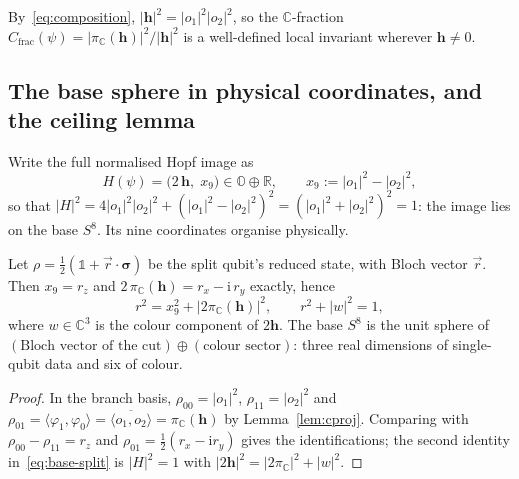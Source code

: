\begin{corollary}\label{app:cor:cproj}
By~\eqref{eq:composition}, $|\mathbf{h}|^2 = |o_1|^2|o_2|^2$, so the $\mathbb{C}$-fraction
$C_{\mathrm{frac}}(\psi) = |\pi_{\mathbb{C}}(\mathbf{h})|^2/|\mathbf{h}|^2$ is a well-defined
local invariant wherever $\mathbf{h}\neq0$.
\end{corollary}

\subsection{The base sphere in physical coordinates, and the ceiling lemma}

Write the full normalised Hopf image as
\begin{equation}
  H(\psi) = \bigl(2\,\mathbf{h},\;x_9\bigr)\in\mathbb{O}\oplus\mathbb{R},
  \qquad x_9 := |o_1|^2-|o_2|^2,
\end{equation}
so that $|H|^2 = 4|o_1|^2|o_2|^2 + (|o_1|^2-|o_2|^2)^2 = (|o_1|^2+|o_2|^2)^2 = 1$: the image lies on
the base $S^8$. Its nine coordinates organise physically.

\begin{lemma}\label{app:lem:base}
Let $\rho = \tfrac12(\mathbb{1}+\vec r\cdot\boldsymbol{\sigma})$ be the split qubit's reduced state,
with Bloch vector $\vec r$. Then $x_9 = r_z$ and $2\,\pi_{\mathbb{C}}(\mathbf{h}) = r_x -
\mathrm{i}\,r_y$ exactly, hence
\begin{equation}
  r^2 = x_9^2 + |2\pi_{\mathbb{C}}(\mathbf{h})|^2,
  \qquad
  r^2 + |w|^2 = 1,
  \label{eq:base-split}
\end{equation}
where $w\in\mathbb{C}^3$ is the colour component of $2\mathbf{h}$. The base $S^8$ is the unit sphere
of $(\text{Bloch vector of the cut})\oplus(\text{colour sector})$: three real dimensions of
single-qubit data and six of colour.
\end{lemma}

\begin{proof}
In the branch basis, $\rho_{00} = |o_1|^2$, $\rho_{11} = |o_2|^2$ and
$\rho_{01} = \langle\varphi_1,\varphi_0\rangle = \overline{\langle o_1,o_2\rangle} =
\pi_{\mathbb{C}}(\mathbf{h})$ by Lemma~\ref{lem:cproj}. Comparing with
$\rho_{00}-\rho_{11} = r_z$ and $\rho_{01} = \tfrac12(r_x-\mathrm{i}r_y)$ gives the identifications;
the second identity in~\eqref{eq:base-split} is $|H|^2 = 1$ with $|2\mathbf{h}|^2 =
|2\pi_{\mathbb{C}}|^2 + |w|^2$.
\end{proof}

